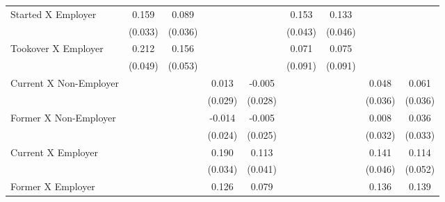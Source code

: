 {\begin{tabular}{l*{8}{c}}
Started X Employer  &       0.159\sym{***}&       0.089\sym{*}  &                     &                     &       0.153\sym{***}&       0.133\sym{**} &                     &                     \\
                    &     (0.033)         &     (0.036)         &                     &                     &     (0.043)         &     (0.046)         &                     &                     \\
Tookover X Employer &       0.212\sym{***}&       0.156\sym{**} &                     &                     &       0.071         &       0.075         &                     &                     \\
                    &     (0.049)         &     (0.053)         &                     &                     &     (0.091)         &     (0.091)         &                     &                     \\
Current X Non-Employer&                     &                     &       0.013         &      -0.005         &                     &                     &       0.048         &       0.061         \\
                    &                     &                     &     (0.029)         &     (0.028)         &                     &                     &     (0.036)         &     (0.036)         \\
Former X Non-Employer&                     &                     &      -0.014         &      -0.005         &                     &                     &       0.008         &       0.036         \\
                    &                     &                     &     (0.024)         &     (0.025)         &                     &                     &     (0.032)         &     (0.033)         \\
Current X Employer  &                     &                     &       0.190\sym{***}&       0.113\sym{**} &                     &                     &       0.141\sym{**} &       0.114\sym{*}  \\
                    &                     &                     &     (0.034)         &     (0.041)         &                     &                     &     (0.046)         &     (0.052)         \\
Former X Employer   &                     &                     &       0.126\sym{*}  &       0.079         &                     &                     &       0.136         &       0.139\sym{*}  \\

\end{tabular}}
